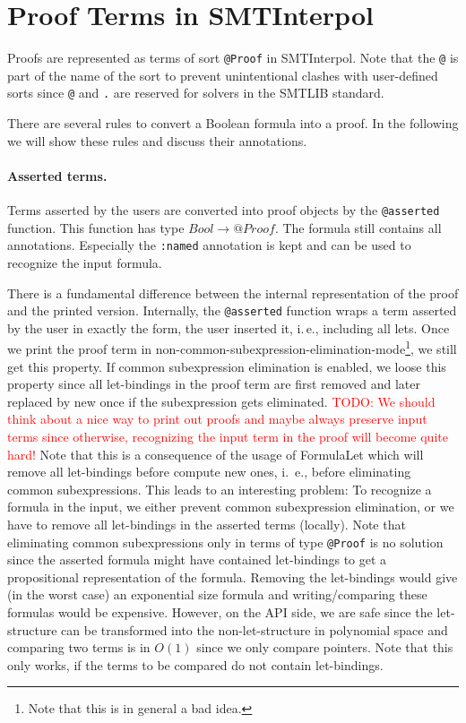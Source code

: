 \documentclass[a4paper]{article}
\newcommand\si{SMTInterpol\xspace}
\newcommand\todo[1]{\textcolor{red}{TODO: #1}}
\begin{document}
\section{Proof Terms in \si}
Proofs are represented as terms of sort \verb+@Proof+ in \si.  Note that the
\verb+@+ is part of the name of the sort to prevent unintentional clashes with
user-defined sorts since \verb+@+ and \verb+.+ are reserved for solvers in the
SMTLIB standard.

There are several rules to convert a Boolean formula into a proof.  In the
following we will show these rules and discuss their annotations.

\paragraph{Asserted terms.}  Terms asserted by the users are converted into
proof objects by the \verb+@asserted+ function.  This function has type
$Bool\rightarrow @Proof$.  The formula still contains all annotations.
Especially the \verb+:named+ annotation is kept and can be used to recognize
the input formula.

There is a fundamental difference between the internal representation of the
proof and the printed version.  Internally, the \verb+@asserted+ function
wraps a term asserted by the user in exactly the form, the user inserted it,
i.\,e., including all lets.  Once we print the proof term in
non-common-subexpression-elimination-mode\footnote{Note that this is in
  general a bad idea.}, we still get this property.  If common subexpression
elimination is enabled, we loose this property since all let-bindings in the
proof term are first removed and later replaced by new once if the
subexpression gets eliminated.
\todo{We should think about a nice way to print out proofs and maybe always
  preserve input terms since otherwise, recognizing the input term in the
  proof will become quite hard!}
Note that this is a consequence of the usage of FormulaLet which will remove
all let-bindings before compute new ones, i.~e., before eliminating common
subexpressions.  This leads to an interesting problem:  To recognize a formula
in the input, we either prevent common subexpression elimination, or we have
to remove all let-bindings in the asserted terms (locally).  Note that
eliminating common subexpressions only in terms of type \verb+@Proof+ is no
solution since the asserted formula might have contained let-bindings to get a
propositional representation of the formula.  Removing the let-bindings would
give (in the worst case) an exponential size formula and writing/comparing
these formulas would be expensive.  However, on the API side, we are safe
since the let-structure can be transformed into the non-let-structure in
polynomial space and comparing two terms is in $O(1)$ since we only compare
pointers.  Note that this only works, if the terms to be compared do not
contain let-bindings.
\end{document}
